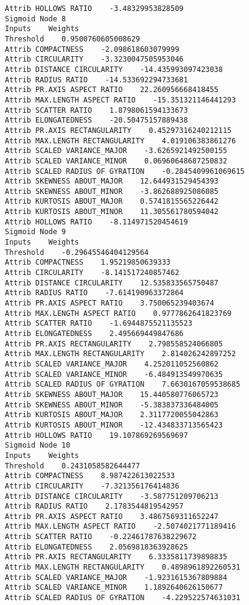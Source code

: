 \documentclass[
	article,			%
	11pt,				%
	oneside,			%
	a4paper,			%
	english,			%
	brazil,				%
	sumario=tradicional
	]{abntex2}
\begin{document}
\begin{lstlisting}
Attrib HOLLOWS RATIO    -3.48329953828509
Sigmoid Node 8
Inputs    Weights
Threshold    0.9500760605008629
Attrib COMPACTNESS    -2.098618603079999
Attrib CIRCULARITY    -3.3230047505953046
Attrib DISTANCE CIRCULARITY    -14.435993097423038
Attrib RADIUS RATIO    -14.533692294733681
Attrib PR.AXIS ASPECT RATIO    22.260956668418455
Attrib MAX.LENGTH ASPECT RATIO    -15.351321146441293
Attrib SCATTER RATIO    1.8798061594133673
Attrib ELONGATEDNESS    -20.50475157889438
Attrib PR.AXIS RECTANGULARITY    0.45297316240212115
Attrib MAX.LENGTH RECTANGULARITY    4.019106383861276
Attrib SCALED VARIANCE_MAJOR    -3.6265921492500155
Attrib SCALED VARIANCE_MINOR    0.06960648687250832
Attrib SCALED RADIUS OF GYRATION    -0.2845409961069615
Attrib SKEWNESS ABOUT_MAJOR    12.644931529454393
Attrib SKEWNESS ABOUT_MINOR    -3.862688925086085
Attrib KURTOSIS ABOUT_MAJOR    0.5741815565226442
Attrib KURTOSIS ABOUT_MINOR    11.305561780594042
Attrib HOLLOWS RATIO    -8.114971520454619
Sigmoid Node 9
Inputs    Weights
Threshold    -0.29645546404129564
Attrib COMPACTNESS    1.95219850639333
Attrib CIRCULARITY    -8.141517240857462
Attrib DISTANCE CIRCULARITY    12.535833565750487
Attrib RADIUS RATIO    -7.614190963372864
Attrib PR.AXIS ASPECT RATIO    3.750065239403674
Attrib MAX.LENGTH ASPECT RATIO    0.9777862641823769
Attrib SCATTER RATIO    -1.6944875521135523
Attrib ELONGATEDNESS    2.495669449847686
Attrib PR.AXIS RECTANGULARITY    2.798558524066805
Attrib MAX.LENGTH RECTANGULARITY    2.814026242897252
Attrib SCALED VARIANCE_MAJOR    4.252011052560862
Attrib SCALED VARIANCE_MINOR    -6.484913549970635
Attrib SCALED RADIUS OF GYRATION    7.6630167059538685
Attrib SKEWNESS ABOUT_MAJOR    15.440580776065723
Attrib SKEWNESS ABOUT_MINOR    -5.383837336484005
Attrib KURTOSIS ABOUT_MAJOR    2.3117720055042863
Attrib KURTOSIS ABOUT_MINOR    -12.434833713565423
Attrib HOLLOWS RATIO    19.107869269569697
Sigmoid Node 10
Inputs    Weights
Threshold    0.2431058582644477
Attrib COMPACTNESS    8.987422613022533
Attrib CIRCULARITY    -7.321356176414836
Attrib DISTANCE CIRCULARITY    -3.587751209706213
Attrib RADIUS RATIO    2.1783544819542957
Attrib PR.AXIS ASPECT RATIO    3.4867569311652247
Attrib MAX.LENGTH ASPECT RATIO    -2.5074021771189416
Attrib SCATTER RATIO    -0.22461787638229672
Attrib ELONGATEDNESS    2.0569818363928625
Attrib PR.AXIS RECTANGULARITY    6.3335811739898835
Attrib MAX.LENGTH RECTANGULARITY    0.4898961892260531
Attrib SCALED VARIANCE_MAJOR    -1.9231615367809884
Attrib SCALED VARIANCE_MINOR    1.1892640626150677
Attrib SCALED RADIUS OF GYRATION    -4.229522574631031

\end{lstlisting}
\end{document}
